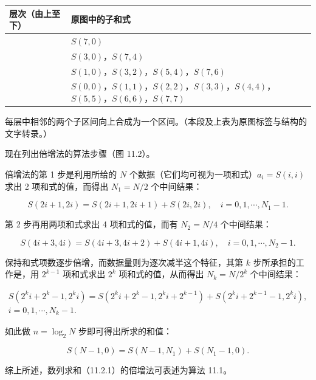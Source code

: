 \documentclass[
  10pt,
  fontset=fandol]{ctexart}
\newcounter{none} %
\begin{document}
{\def\LTcaptype{none} %
\begin{longtable}[]{@{}
  >{\raggedright\arraybackslash}p{}
  >{\raggedright\arraybackslash}p{}@{}}
\toprule\noalign{}
\begin{minipage}[b]{\linewidth}\raggedright
层次（由上至下）
\end{minipage} & \begin{minipage}[b]{\linewidth}\raggedright
原图中的子和式
\end{minipage} \\
\midrule\noalign{}
\endhead
\bottomrule\noalign{}
\endlastfoot
1 & \(S(7,0)\) \\
2 & \(S(3,0)\)，\(S(7,4)\) \\
3 & \(S(1,0)\)，\(S(3,2)\)，\(S(5,4)\)，\(S(7,6)\) \\
4 & \(S(0,0)\)，\(S(1,1)\)，\(S(2,2)\)，\(S(3,3)\)，\(S(4,4)\)，\(S(5,5)\)，\(S(6,6)\)，\(S(7,7)\) \\
\end{longtable}
}

每层中相邻的两个子区间向上合成为一个区间。（本段及上表为原图标签与结构的文字转录。）

现在列出倍增法的算法步骤（图 11.2）。

倍增法的第 1 步是利用所给的 \(N\) 个数据（它们均可视为一项和式）\(a_i=S(i,i)\) 求出 2 项和式的值，而得出 \(N_1=N/2\) 个中间结果：

\[
S(2i+1,2i)=S(2i+1,2i+1)+S(2i,2i),\quad i=0,1,\cdots,N_1-1.
\]

第 2 步再用两项和式求出 4 项和式的值，而有 \(N_2=N/4\) 个中间结果：

\[
S(4i+3,4i)=S(4i+3,4i+2)+S(4i+1,4i),\quad i=0,1,\cdots,N_2-1.
\]

保持和式项数逐步倍增，而数据量则为逐次减半这个特征，其第 \(k\) 步所承担的工作是，用 \(2^{k-1}\) 项和式求出 \(2^k\) 项和式的值，从而得出 \(N_k=N/2^k\) 个中间结果：

\[
\begin{gathered}
S(2^ki+2^k-1,2^ki)=S(2^ki+2^k-1,2^ki+2^{k-1})+S(2^ki+2^{k-1}-1,2^ki),\\
i=0,1,\cdots,N_k-1.
\end{gathered}
\tag{11.2.3}
\]

如此做 \(n=\log_2 N\) 步即可得出所求的和值：

\[
S(N-1,0)=S(N-1,N_1)+S(N_1-1,0).
\]

综上所述，数列求和（11.2.1）的倍增法可表述为算法 11.1。
\end{document}
